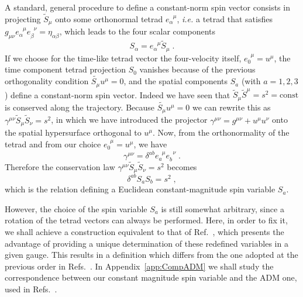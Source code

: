 \documentclass[
superscriptaddress,
preprint,
prd,tightenlines,showpacs,nofootinbib,
eqsecnum,
amsfonts,amsmath,amssymb]{revtex4-1}
\begin{document}
A standard, general procedure to define a constant-norm spin vector
consists in projecting $\tilde{S}_\mu$ onto some orthonormal tetrad
$e_\alpha^{\phantom{\alpha}\mu}$, \textit{i.e.} a tetrad that satisfies
$g_{\mu\nu}e_\alpha^{\phantom{\alpha}\mu}e_\beta^{\phantom{\beta}\nu}=\eta_{\alpha\beta}$,
which leads to the four scalar components
%
\begin{equation}\label{constantspin0}
	S_\alpha = e_\alpha^{\phantom{\alpha}\mu} \tilde{S}_{\mu}\; .
\end{equation}
%
If we choose for the time-like tetrad vector the four-velocity itself,
$e_0^{\phantom{0}\mu} = u^\mu$, the time component tetrad projection
$S_{0}$ vanishes because of the previous orthogonality condition
$\tilde{S_{\mu}}u^{\mu}=0$, and the spatial components $S_a$ (with
$a=1,2,3$) define a constant-norm spin vector. Indeed we have seen
that $\tilde{S}_{\mu}\tilde{S}^{\mu} = s^{2} = \mathrm{const}$ is
conserved along the trajectory. Because $\tilde{S_{\mu}}u^{\mu}=0$ we
can rewrite this as $\gamma^{\mu\nu}\tilde{S}_{\mu}\tilde{S}_{\nu} =
s^{2}$, in which we have introduced the projector
$\gamma^{\mu\nu}=g^{\mu\nu}+u^\mu u^\nu$ onto the spatial hypersurface
orthogonal to $u^\mu$. Now, from the orthonormality of the tetrad
and from our choice $e_0^{\phantom{0}\mu} = u^\mu$, we have
%
\begin{equation}\label{projecteur}
	\gamma^{\mu\nu}=\delta^{ab}e_a^{\phantom{a}\mu}e_b^{\phantom{\beta}\nu}\; .
\end{equation}
%
Therefore the conservation law
$\gamma^{\mu\nu}\tilde{S}_{\mu}\tilde{S}_{\nu} = s^{2}$ becomes
%
\begin{equation}\label{orthog}
	\delta^{ab}S_{a}S_{b} = s^{2}\; ,
\end{equation}
%
which is the relation defining a Euclidean constant-magnitude spin
variable $S_a$.

However, the choice of the spin variable $S_a$ is still somewhat
arbitrary, since a rotation of the tetrad vectors can always be
performed. Here, in order to fix it, we shall achieve a construction
equivalent to that of Ref.~\cite{Damour2008a}, which presents the
advantage of providing a unique determination of these redefined
variables in a given gauge. This results in a definition which differs
from the one adopted at the previous order in
Refs.~\cite{Faye2006,Blanchet2006}. In Appendix~\ref{app:CompADM} we
shall study the correspondence between our constant magnitude spin
variable and the ADM one, used in
Refs.~\cite{Damour2008a,Hartung2011}.
\end{document}
